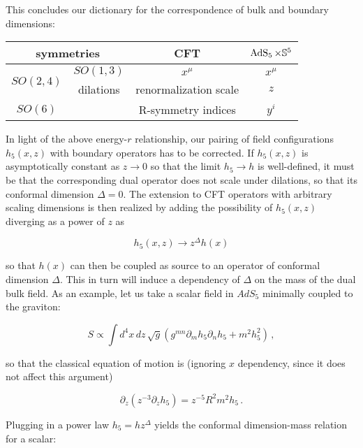 This concludes our dictionary for the correspondence of bulk and boundary dimensions:

\begin{center}
	\begin{tabular}{cc|c|c}
		\multicolumn{2}{c|}{symmetries}	 & CFT & $\operatorname{AdS}_{5} \times \mathbb{S}^5$\\ \midrule\midrule
		\multirow{2}{*}{$SO(2,4)$} & $SO(1,3)$ & $x^\mu$ & $x^\mu$ \\
	& dilations & renormalization scale & $z$ \\
	$SO(6)$ & & R-symmetry indices & $y^i$
	\end{tabular}
\end{center}

In light of the above energy-$r$ relationship, our pairing of field configurations $h_5(x,z)$ with boundary operators has to be corrected. If $h_5(x,z)$ is asymptotically constant as $z\rightarrow 0$ so that the limit $h_5 \rightarrow h$ is well-defined, it must be that the corresponding dual operator does not scale under dilations, so that its conformal dimension $\Delta = 0$. The extension to CFT operators with arbitrary scaling dimensions is then realized by adding the possibility of $h_5(x,z)$ diverging as a power of $z$ as

\begin{equation}
	h_5(x,z) \rightarrow z^\Delta h(x)
	\label{}
\end{equation}

so that $h(x)$ can then be coupled as source to an operator of conformal dimension $\Delta$. This in turn will induce a dependency of $\Delta$ on the mass of the dual bulk field. As an example, let us take a scalar field in $AdS_5$ minimally coupled to the graviton:

\begin{equation}
	S \propto \int d^4 x\, dz \, \sqrt g \left( g^{mn} \partial_m h_5 \partial_n h_5 + m^2 h_5^2 \right)\,,
	\label{}
\end{equation}

so that the classical equation of motion is (ignoring $x$ dependency, since it does not affect this argument)

\begin{equation}
	\partial_z \left( z^{-3} \partial_z h_5 \right) = z^{-5} R^2 m^2 h_5 \,.
	\label{ }
\end{equation}

Plugging in a power law $h_5 = h z^\Delta$ yields the conformal dimension-mass relation for a scalar:


